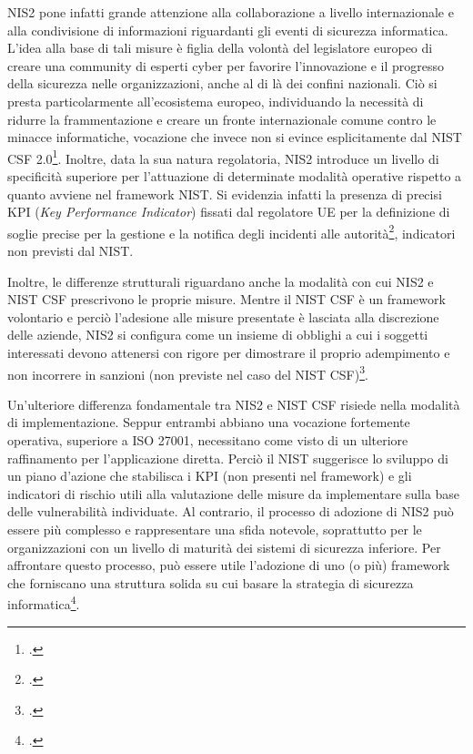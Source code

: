 NIS2 pone infatti grande attenzione alla collaborazione a livello internazionale e alla condivisione di informazioni
riguardanti gli eventi di sicurezza informatica. L'idea alla base di tali misure è figlia della volontà del legislatore europeo di creare 
una community di esperti cyber per favorire l'innovazione e il progresso della sicurezza nelle organizzazioni, anche al di là dei confini 
nazionali. Ciò si presta particolarmente all'ecosistema europeo, individuando la necessità di ridurre la frammentazione e creare un fronte 
internazionale comune contro le minacce informatiche, vocazione che invece non si evince esplicitamente dal NIST CSF 2.0\footcite[p. 4]{parmar-miles-csf}.
Inoltre, data la sua natura regolatoria, NIS2 introduce un livello di specificità superiore per l'attuazione di determinate 
modalità operative rispetto a quanto avviene nel framework NIST. Si evidenzia infatti la presenza di precisi KPI 
(\textit{Key Performance Indicator}) fissati dal regolatore UE per la definizione di soglie precise per la gestione e la 
notifica degli incidenti alle autorità\footcite[p. 5]{parmar-miles-csf}, indicatori non previsti dal NIST.

Inoltre, le differenze strutturali riguardano anche la modalità con cui NIS2 e NIST CSF prescrivono le proprie misure.
Mentre il NIST CSF è un framework volontario e perciò l'adesione alle misure presentate è lasciata alla discrezione delle
aziende, NIS2 si configura come un insieme di obblighi a cui i soggetti interessati devono attenersi con rigore per dimostrare
il proprio adempimento e non incorrere in sanzioni (non previste nel caso del NIST CSF)\footcite[p. 4]{parmar-miles-csf}.

Un'ulteriore differenza fondamentale tra NIS2 e NIST CSF risiede nella modalità di implementazione. 
Seppur entrambi abbiano una vocazione fortemente operativa, superiore a ISO 27001, necessitano come visto di un ulteriore raffinamento per l'applicazione diretta.
Perciò il NIST suggerisce lo sviluppo di un piano d'azione che stabilisca i KPI (non presenti nel framework) e gli indicatori di rischio
utili alla valutazione delle misure da implementare sulla base delle vulnerabilità individuate. 
Al contrario, il processo di adozione di NIS2 può essere più complesso e rappresentare una sfida notevole, soprattutto per le 
organizzazioni con un livello di maturità dei sistemi di sicurezza inferiore. Per affrontare questo processo, 
può essere utile l'adozione di uno (o più) framework che forniscano una struttura solida su cui basare la strategia di sicurezza informatica\footcite{parmar-miles-csf}.

